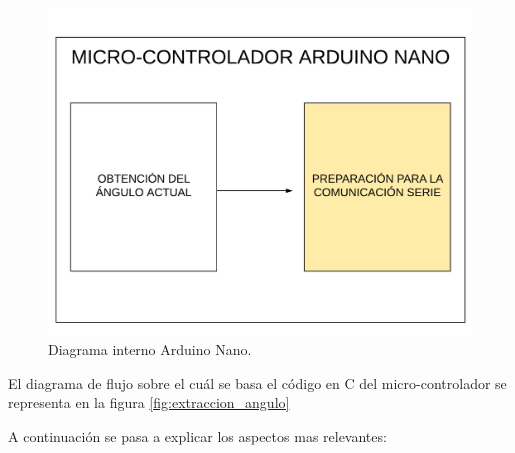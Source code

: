 \begin{figure}[H]
	\center
	\includegraphics[trim = 0mm 0mm 0mm 0mm, clip,scale=0.3]{imagenes/Balancing_robot/coexistencia3.pdf}
	\caption{Diagrama interno Arduino Nano.}
	\label{fig:coexistencia3}
\end{figure}

El diagrama de flujo sobre el cuál se basa el código en C del micro-controlador se representa en la figura \ref{fig:extraccion_angulo}

A continuación se pasa a explicar los aspectos mas relevantes: 

